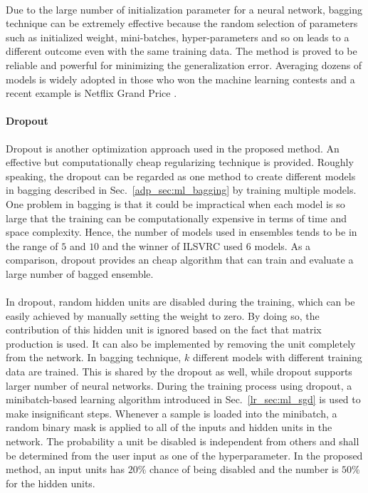 \paragraph{}
Due to the large number of initialization parameter for a neural network, bagging technique can be extremely effective because the random selection of parameters such as initialized weight, mini-batches, hyper-parameters and so on leads to a different outcome even with the same training data.
The method is proved to be reliable and powerful for minimizing the generalization error.
Averaging dozens of models is widely adopted in those who won the machine learning contests and a recent example is Netflix Grand Price \citep{koren2009}.


\paragraph{Dropout}
Dropout \citep{JMLR:v15:srivastava14a} is another optimization approach used in the proposed method.
An effective but computationally cheap regularizing technique is provided.
Roughly speaking, the dropout can be regarded as one method to create different models in bagging described in Sec.~\ref{adp_sec:ml_bagging} by training multiple models.
One problem in bagging is that it could be impractical when each model is so large that the training can be computationally expensive in terms of time and space complexity.
Hence, the number of models used in ensembles tends to be in the range of $5$ and $10$ and the winner of ILSVRC \citep{DBLP:journals/corr/SzegedyLJSRAEVR14} used $6$ models.
As a comparison, dropout provides an cheap algorithm that can train and evaluate a large number of bagged ensemble.

\paragraph{}
In dropout, random hidden units are disabled during the training, which can be easily achieved by manually setting the weight to zero.
By doing so, the contribution of this hidden unit is ignored based on the fact that matrix production is used.
It can also be implemented by removing the unit completely from the network.
In bagging technique, $k$ different models with different training data are trained.
This is shared by the dropout as well, while dropout supports larger number of neural networks.
During the training process using dropout, a minibatch-based learning algorithm introduced in Sec.~\ref{lr_sec:ml_sgd} is used to make insignificant steps.
Whenever a sample is loaded into the minibatch, a random binary mask is applied to all of the inputs and hidden units in the network.
The probability a unit be disabled is independent from others and shall be determined from the user input as one of the hyperparameter.
In the proposed method, an input units has $20\%$ chance of being disabled and the number is $50\%$ for the hidden units.


